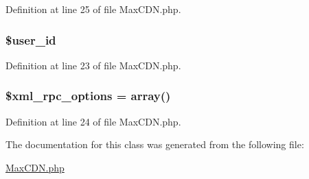 Definition at line 25 of file MaxCDN.php.

\hypertarget{class_max_c_d_n_af0fcd925f00973e32f7214859dfb3c6b}{
\subsubsection[{\$user\_\-id}]{\setlength{\rightskip}{0pt plus 5cm}\$user\_\-id}}
\label{class_max_c_d_n_af0fcd925f00973e32f7214859dfb3c6b}


Definition at line 23 of file MaxCDN.php.

\hypertarget{class_max_c_d_n_aa9300810e8d9adff7d3fdc176c218363}{
\subsubsection[{\$xml\_\-rpc\_\-options}]{\setlength{\rightskip}{0pt plus 5cm}\$xml\_\-rpc\_\-options = array()}}
\label{class_max_c_d_n_aa9300810e8d9adff7d3fdc176c218363}


Definition at line 24 of file MaxCDN.php.



The documentation for this class was generated from the following file:\begin{DoxyCompactItemize}
\item 
\hyperlink{_max_c_d_n_8php}{MaxCDN.php}\end{DoxyCompactItemize}
